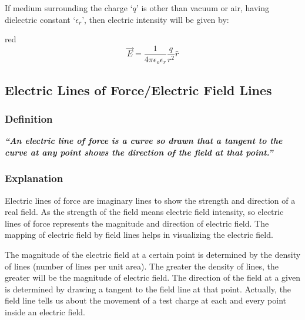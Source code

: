 If medium surrounding the charge `$q$' is other than vacuum or air,
having dielectric constant
`$\epsilon_{r}$', then electric intensity will be given by:
\begin{mybox}{red}{}
\begin{equation}\label{eq:11.16}
  \vec{E} = \frac{1}{4\pi\epsilon_{o}\epsilon_{r}} \frac{q}{r^{2}} \hat{r}
\end{equation}
\end{mybox}
\newpage
\subsection{Electric Lines of Force/Electric Field Lines}
\subsubsection{Definition}
\textit{\textbf{“An electric line of force is a curve so drawn that a tangent to the curve at any point
shows the direction of the field at that point.”}}
\subsubsection{Explanation}
Electric lines of force are imaginary lines to show the strength
and direction of a real field. As the strength of the field means
electric field intensity, so electric lines of force represents the
magnitude and direction of electric field. The mapping of electric
field by field lines helps in visualizing the electric field.

The magnitude of the electric field at a certain point is
determined by the density of lines (number of lines per unit area).
The greater the density of lines, the greater will be the magnitude
of electric field. The direction of the field at a given is determined
by drawing a tangent to the field line at that point. Actually,
the field line tells us about the movement of a test charge at
each and every point inside an electric field.
